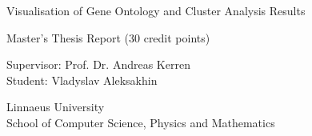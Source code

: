 \begin{titlepage}
\begin{center}

\Huge{Visualisation of Gene Ontology and Cluster Analysis Results}

\vfill

\begin{Large}
Master's Thesis Report (30 credit points)

\vfill

Supervisor: Prof. Dr. Andreas Kerren\\
Student: Vladyslav Aleksakhin

\vfill

Linnaeus University\\
School of Computer Science, Physics and Mathematics

\end{Large}


\end{center}
\end{titlepage}
